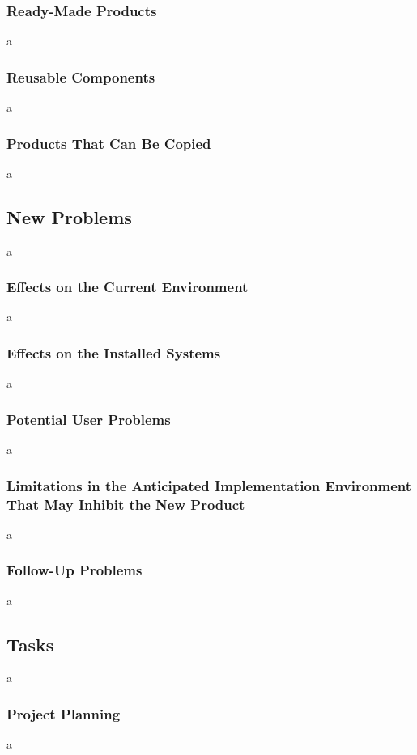 \documentclass[12pt]{article}
\begin{document}
\subsubsection{Ready-Made Products}
a

\subsubsection{Reusable Components}
a

\subsubsection{Products That Can Be Copied}
a

\subsection{New Problems}
a

\subsubsection{Effects on the Current Environment}
a

\subsubsection{Effects on the Installed Systems }
a

\subsubsection{Potential User Problems}
a

\subsubsection{Limitations in the Anticipated Implementation Environment That May Inhibit the New Product}
a

\subsubsection{Follow-Up Problems}
a

\subsection{Tasks}
a

\subsubsection{Project Planning}
a
\end{document}

